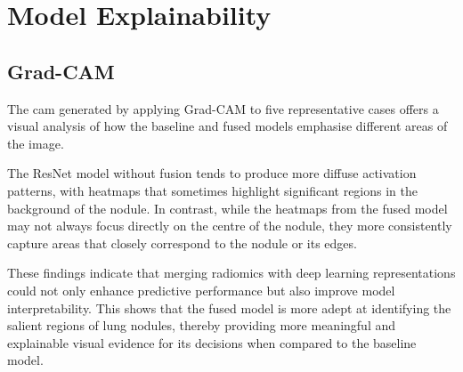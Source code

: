 \section{Model Explainability}

\subsection{Grad-CAM}

The \ac{cam} generated by applying Grad-CAM to five representative cases offers a visual analysis of how the baseline and fused models emphasise different areas of the image.

The ResNet model without fusion tends to produce more diffuse activation patterns, with heatmaps that sometimes highlight significant regions in the background of the nodule. In contrast, while the heatmaps from the fused model may not always focus directly on the centre of the nodule, they more consistently capture areas that closely correspond to the nodule or its edges. 

These findings indicate that merging radiomics with deep learning representations could not only enhance predictive performance but also improve model interpretability. This shows that the fused model is more adept at identifying the salient regions of lung nodules, thereby providing more meaningful and explainable visual evidence for its decisions when compared to the baseline model.

